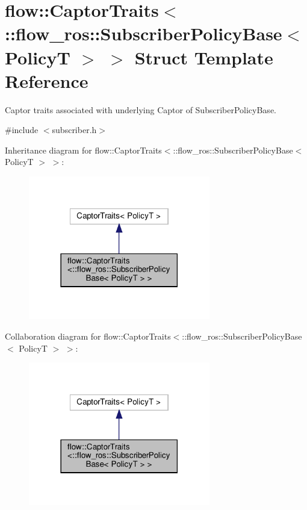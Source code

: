 \hypertarget{structflow_1_1_captor_traits_3_1_1flow__ros_1_1_subscriber_policy_base_3_01_policy_t_01_4_01_4}{}\section{flow\+:\+:Captor\+Traits$<$\+:\+:flow\+\_\+ros\+:\+:Subscriber\+Policy\+Base$<$ PolicyT $>$ $>$ Struct Template Reference}
\label{structflow_1_1_captor_traits_3_1_1flow__ros_1_1_subscriber_policy_base_3_01_policy_t_01_4_01_4}


Captor traits associated with underlying Captor of Subscriber\+Policy\+Base.  




{\ttfamily \#include $<$subscriber.\+h$>$}



Inheritance diagram for flow\+:\+:Captor\+Traits$<$\+:\+:flow\+\_\+ros\+:\+:Subscriber\+Policy\+Base$<$ PolicyT $>$ $>$\+:\nopagebreak
\begin{figure}[H]
\begin{center}
\leavevmode
\includegraphics[width=225pt]{structflow_1_1_captor_traits_3_1_1flow__ros_1_1_subscriber_policy_base_3_01_policy_t_01_4_01_4__inherit__graph}
\end{center}
\end{figure}


Collaboration diagram for flow\+:\+:Captor\+Traits$<$\+:\+:flow\+\_\+ros\+:\+:Subscriber\+Policy\+Base$<$ PolicyT $>$ $>$\+:\nopagebreak
\begin{figure}[H]
\begin{center}
\leavevmode
\includegraphics[width=225pt]{structflow_1_1_captor_traits_3_1_1flow__ros_1_1_subscriber_policy_base_3_01_policy_t_01_4_01_4__coll__graph}
\end{center}
\end{figure}


